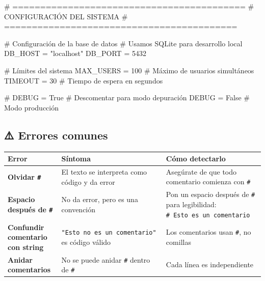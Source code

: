 \documentclass[
  doc,
  floatsintext,
  longtable,
  a4paper,
  nolmodern,
  notxfonts,
  notimes,
  12pt,
  colorlinks=true,linkcolor=blue,citecolor=blue,urlcolor=blue]{apa7}
\newenvironment{Shaded}{\begin{snugshade}}{\end{snugshade}}
\newcommand{\CommentTok}[1]{\textcolor[rgb]{0.37,0.37,0.37}{#1}}
\newcommand{\DecValTok}[1]{\textcolor[rgb]{0.68,0.00,0.00}{#1}}
\newcommand{\NormalTok}[1]{\textcolor[rgb]{0.00,0.23,0.31}{#1}}
\newcommand{\OperatorTok}[1]{\textcolor[rgb]{0.37,0.37,0.37}{#1}}
\newcommand{\StringTok}[1]{\textcolor[rgb]{0.13,0.47,0.30}{#1}}
\newcommand{\VariableTok}[1]{\textcolor[rgb]{0.07,0.07,0.07}{#1}}
\newcounter{none} %
\begin{document}
\begin{Shaded}
\begin{Highlighting}[]
\CommentTok{\# ==========================================}
\CommentTok{\# CONFIGURACIÓN DEL SISTEMA}
\CommentTok{\# ==========================================}

\CommentTok{\# Configuración de la base de datos}
\CommentTok{\# Usamos SQLite para desarrollo local}
\NormalTok{DB\_HOST }\OperatorTok{=} \StringTok{"localhost"}
\NormalTok{DB\_PORT }\OperatorTok{=} \DecValTok{5432}

\CommentTok{\# Límites del sistema}
\NormalTok{MAX\_USERS }\OperatorTok{=} \DecValTok{100}  \CommentTok{\# Máximo de usuarios simultáneos}
\NormalTok{TIMEOUT }\OperatorTok{=} \DecValTok{30}     \CommentTok{\# Tiempo de espera en segundos}

\CommentTok{\# DEBUG = True   \# Descomentar para modo depuración}
\NormalTok{DEBUG }\OperatorTok{=} \VariableTok{False}    \CommentTok{\# Modo producción}
\end{Highlighting}
\end{Shaded}

\subsection{⚠️ Errores comunes}\label{errores-comunes}

{\def\LTcaptype{none} %
\begin{longtable}[]{@{}
  >{\raggedright\arraybackslash}p{}
  >{\raggedright\arraybackslash}p{}
  >{\raggedright\arraybackslash}p{}@{}}
\toprule\noalign{}
\begin{minipage}[b]{\linewidth}\raggedright
Error
\end{minipage} & \begin{minipage}[b]{\linewidth}\raggedright
Síntoma
\end{minipage} & \begin{minipage}[b]{\linewidth}\raggedright
Cómo detectarlo
\end{minipage} \\
\midrule\noalign{}
\endhead
\bottomrule\noalign{}
\endlastfoot
\textbf{Olvidar \texttt{\#}} & El texto se interpreta como código y da
error & Asegúrate de que todo comentario comienza con \texttt{\#} \\
\textbf{Espacio después de \texttt{\#}} & No da error, pero es una
convención & Pon un espacio después de \texttt{\#} para legibilidad:
\texttt{\#\ Esto\ es\ un\ comentario} \\
\textbf{Confundir comentario con string} &
\texttt{"Esto\ no\ es\ un\ comentario"} es código válido & Los
comentarios usan \texttt{\#}, no comillas \\
\textbf{Anidar comentarios} & No se puede anidar \texttt{\#} dentro de
\texttt{\#} & Cada línea es independiente \\
\end{longtable}
}
\end{document}
